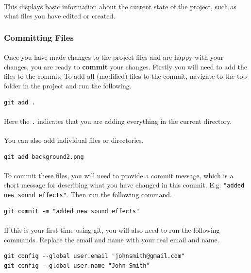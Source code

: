 \documentclass[11pt]{article}
\begin{document}
\paragraph{}
This displays basic information about the current state of the project, such as what files you have edited or created.
\subsubsection{Committing Files}
\paragraph{}
Once you have made changes to the project files and are happy with your changes, you are ready to \textbf{commit} your changes. Firstly you will need to add the files to the commit. To add all (modified) files to the commit, navigate to the top folder in the project and run the following.
\begin{lstlisting}
git add .
\end{lstlisting}
\paragraph{}
Here the \lstinline{.} indicates that you are adding everything in the current directory.
\paragraph{}
You can also add individual files or directories.
\begin{lstlisting}
git add background2.png
\end{lstlisting}
\paragraph{}
To commit these files, you will need to provide a commit message, which is a short message for describing what you have changed in this commit. E.g. \lstinline{"added new sound effects"}. Then run the following command.
\begin{lstlisting}
git commit -m "added new sound effects"
\end{lstlisting}
\paragraph{}
If this is your first time using git, you will also need to run the following commands. Replace the email and name with your real email and name.
\begin{lstlisting}
git config --global user.email "johnsmith@gmail.com"
git config --global user.name "John Smith"
\end{lstlisting}
\end{document}
